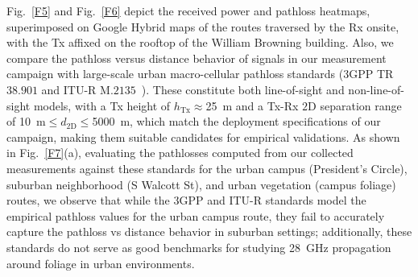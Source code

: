 \documentclass[12pt, draftcls, onecolumn]{IEEEtran}
\begin{document}
Fig.~\ref{F5} and Fig.~\ref{F6} depict the received power and pathloss heatmaps, superimposed on Google Hybrid maps of the routes traversed by the Rx onsite, with the Tx affixed on the rooftop of the William Browning building. Also, we compare the pathloss versus distance behavior of signals in our measurement campaign with large-scale urban macro-cellular pathloss standards ($3$GPP TR$38.901$ and ITU-R M$.2135$~\cite{MacCartneyModelsOverview}). These constitute both line-of-sight and non-line-of-sight models, with a Tx height of $h_{\text{Tx}}{\approx}$\SI{25}{\meter} and a Tx-Rx $2$D separation range of \SI{10}{\meter}${\leq}d_{2\text{D}}{\leq}$\SI{5000}{\meter}, which match the deployment specifications of our campaign, making them suitable candidates for empirical validations. As shown in Fig.~\ref{F7}(a), evaluating the pathlosses computed from our collected measurements against these standards for the urban campus (President's Circle), suburban neighborhood (S Walcott St), and urban vegetation (campus foliage) routes, we observe that while the $3$GPP and ITU-R standards model the empirical pathloss values for the urban campus route, they fail to accurately capture the pathloss vs distance behavior in suburban settings; additionally, these standards do not serve as good benchmarks for studying \SI{28}{\giga\hertz} propagation around foliage in urban environments.
\end{document}
